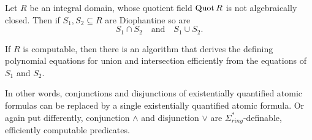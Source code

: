 \begin{lem}\label{lem:intersections and unions}
    Let \(R\) be an integral domain, whose quotient field \(\operatorname{Quot} R\) is not
    algebraically closed. Then if \(S_1, S_2 \subseteq R\) are Diophantine so are
    \[
      S_1 ∩ S_2 \quad \text{and} \quad S_1 ∪ S_2.
    \]

    If \(R\) is computable, then there is an algorithm that derives the defining
    polynomial equations for union and intersection efficiently from the
    equations of \(S_1\) and \(S_2\).
\end{lem}

In other words, conjunctions and disjunctions of existentially quantified atomic
formulas can be replaced by a single existentially quantified atomic formula. Or
again put differently, conjunction \(∧\) and disjunction \(∨\) are
\(Σ_{ring}^*\)-definable, efficiently computable predicates.

